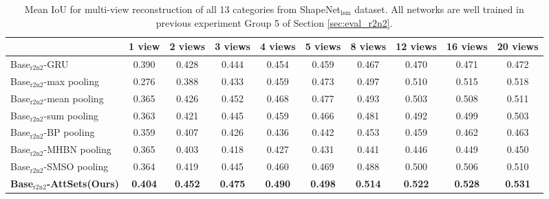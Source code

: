 \documentclass[twocolumn]{svjour3}    \pdfoutput=1
\newcommand{\nickname}{AttSets}
\begin{document}
\begin{table*}[ht]
\caption{Mean IoU for multi-view reconstruction of all 13 categories from ShapeNet$_{\textrm{lsm}}$ dataset. All networks are well trained in previous experiment Group 5 of Section \ref{sec:eval_r2n2}.}
\centering
\label{tab:iou_lsm_allv}
\tabcolsep=0.2cm
\begin{tabular}{ l|ccccccccc}
\hline
&1 view&2 views&3 views& 4 views&5 views&8 views&12 views&16 views&20 views \\
\hline
Base$_{\textrm{r2n2}}$-GRU &0.390&0.428&0.444&0.454&0.459&0.467&0.470&0.471&0.472 \\
Base$_{\textrm{r2n2}}$-max pooling &0.276&0.388&0.433&0.459&0.473&0.497&0.510&0.515&0.518 \\
Base$_{\textrm{r2n2}}$-mean pooling &0.365&0.426&0.452&0.468&0.477&0.493&0.503&0.508&0.511 \\
Base$_{\textrm{r2n2}}$-sum pooling &0.363&0.421&0.445&0.459&0.466&0.481&0.492&0.499&0.503 \\
Base$_{\textrm{r2n2}}$-BP pooling &0.359&0.407&0.426&0.436&0.442&0.453&0.459&0.462&0.463 \\
Base$_{\textrm{r2n2}}$-MHBN pooling &0.365&0.403&0.418&0.427&0.431&0.441&0.446&0.449&0.450 \\
Base$_{\textrm{r2n2}}$-SMSO pooling &0.364&0.419&0.445&0.460&0.469&0.488&0.500&0.506&0.510 \\
\textbf{Base$_{\textrm{r2n2}}$-\nickname{}(Ours)} &\textbf{0.404}&\textbf{0.452}&\textbf{0.475}&\textbf{0.490}&\textbf{0.498}&\textbf{0.514}
&\textbf{0.522}&\textbf{0.528}&\textbf{0.531} \\
\hline
\end{tabular}
\vspace{-0.3 cm}
\end{table*}
\end{document}
